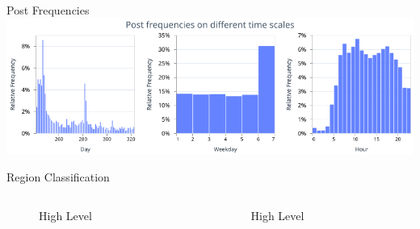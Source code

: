 \begin{frame}{Post Frequencies}
	\includegraphics[width=\linewidth, keepaspectratio]{pictures/paper/sentiments/visualization_valid_posts_frequency.png}
\end{frame}

\begin{frame}{Region Classification}
	\begin{columns}
		
		\begin{column}{0.55\textwidth}
			\begin{tcolorbox}[enhanced jigsaw, colback=white, opacityback=.4, colframe=ElixirPurple, arc=3mm, boxrule=0mm, height=0.8\textheight, valign=center, title=Text Cleaning]
				\begin{figure}[htbp]
					\centering
					\resizebox{\columnwidth}{!}{}
					\caption{High Level}
				\end{figure}
			\end{tcolorbox}
		\end{column}
		
		\begin{column}{0.55\textwidth}
			\begin{tcolorbox}[enhanced jigsaw, colback=white, opacityback=.4, colframe=ElixirPurple, arc=3mm, boxrule=0mm, height=0.8\textheight, valign=center, title=Post Selection]
				
				\begin{figure}[htbp]
					\centering
					\resizebox{\columnwidth}{!}{}
					\caption{High Level}
				\end{figure}
			\end{tcolorbox}
		\end{column}
	\end{columns}
\end{frame}